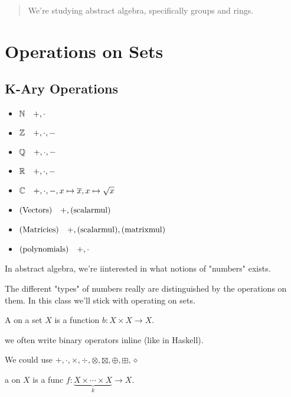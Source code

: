 \documentclass[12pt]{report}
\begin{document}
\maketitle 

\begin{abstract}
  We're studying abstract algebra, specifically groups and rings.
\end{abstract}

\tableofcontents

\pagebreak

\chapter{Operations on Sets}
\section{K-Ary Operations}

\begin{itemize}
  \item \(\mathbb N\quad +,\cdot\)
  \item \(\mathbb Z\quad +,\cdot,-\)
  \item \(\mathbb Q\quad +,\cdot,-\)
  \item \(\mathbb R\quad +,\cdot,-\)
  \item \(\mathbb C\quad +,\cdot,-,x\mapsto\overline x,x\mapsto\sqrt x\)
  \item \((\mathrm{Vectors})\quad +,(\mathrm{scalar mul})\)
  \item \((\mathrm{Matricies})\quad +,(\mathrm{scalar mul}),(\mathrm{matrix mul})\)
  \item \((\mathrm{polynomials})\quad +,\cdot\)
\end{itemize}

In abstract algebra, we're iinterested in what notions of "numbers" exists.

The different "types" of numbers really are distinguished by the operations on
them. In this class we'll stick with operating on sets.

\bbox
\begin{defn}
  A  on a set \(X\) is a function \(b:X\times X\to X\).
\end{defn}
\ebox
\bboxnote
{} we often write binary operators inline (like in Haskell).
\ebox

We could use \(+,\cdot,\times,\div,\otimes,\boxtimes,\oplus,\boxplus,\diamond\)


\bbox
\begin{defn}
  a  on \(X\) is a func \(f:\underset k{\underbrace{
  X\times\cdots\times X}}\to X\).
\end{defn}
\ebox
\end{document}
